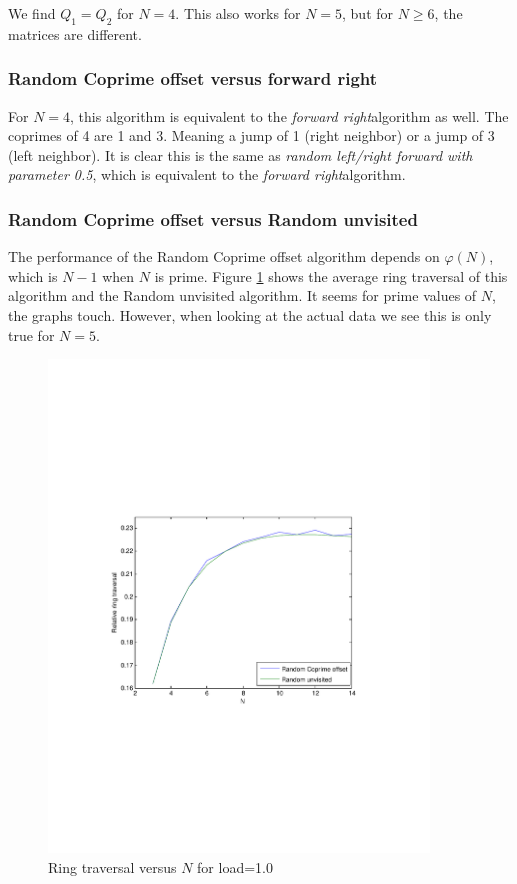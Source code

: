 \documentclass[10pt,a4paper]{article}
\newcommand{\FR}{\textit{forward right\xspace}}
\newcommand{\RLRF}[1]{\textit{random left/right forward with parameter #1\xspace}}
\begin{document}
We find $Q_1 = Q_2$ for $N=4$. This also works for $N=5$, but for $N \geq 6$, the matrices are different.

\subsubsection*{Random Coprime offset versus forward right}
For $N=4$, this algorithm is equivalent to the \FR algorithm as well. The coprimes of 4 are 1 and 3. Meaning a jump of 1 (right neighbor) or a jump of 3 (left neighbor). It is clear this is the same as \RLRF{0.5}, which is equivalent to the \FR algorithm.

\subsubsection*{Random Coprime offset versus Random unvisited}
The performance of the Random Coprime offset algorithm depends on $\varphi(N)$, which is $N-1$ when $N$ is prime. Figure \ref{figrcovsru} shows the average ring traversal of this algorithm and the Random unvisited algorithm. It seems for prime values of $N$, the graphs touch. However, when looking at the actual data we see this is only true for $N=5$.

\begin{figure}[h!tb]
\centering
\includegraphics[clip=true, trim=9em 24em 9em 24em, width=0.9\textwidth]{resources/plotload10rurpo.pdf}
\caption{Ring traversal versus $N$ for load=1.0}
\label{figrcovsru}
\end{figure}
\end{document}
